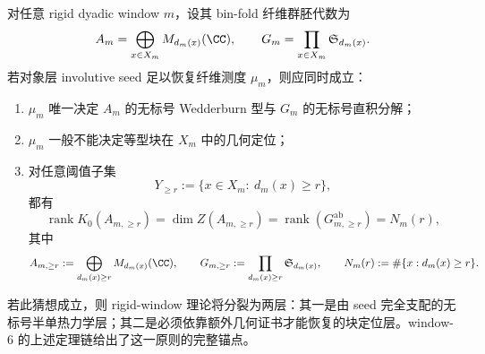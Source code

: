 \begin{conjecture}\label{conj:conclusion-rigid-window-seed-semisimple-type-localization-gap-principle}
对任意 rigid dyadic window \(m\)，设其 bin-fold 纤维群胚代数为
\[
A_m=\bigoplus_{x\in X_m}M_{d_m(x)}(\CC),
\qquad
G_m=\prod_{x\in X_m}\mathfrak S_{d_m(x)}.
\]
若对象层 involutive seed 足以恢复纤维测度 \(\mu_m\)，则应同时成立：
\begin{enumerate}
  \item \(\mu_m\) 唯一决定 \(A_m\) 的无标号 Wedderburn 型与 \(G_m\) 的无标号直积分解；
  \item \(\mu_m\) 一般不能决定等型块在 \(X_m\) 中的几何定位；
  \item 对任意阈值子集
  \[
  Y_{\ge r}:=\{x\in X_m:\ d_m(x)\ge r\},
  \]
  都有
  \[
  \operatorname{rank}K_0(A_{m,\ge r})
  =
  \dim Z(A_{m,\ge r})
  =
  \operatorname{rank}(G_{m,\ge r}^{\mathrm{ab}})
  =
  N_m(r),
  \]
  其中
  \[
  A_{m,\ge r}:=\bigoplus_{d_m(x)\ge r}M_{d_m(x)}(\CC),
  \qquad
  G_{m,\ge r}:=\prod_{d_m(x)\ge r}\mathfrak S_{d_m(x)},
  \qquad
  N_m(r):=\#\{x:d_m(x)\ge r\}.
  \]
\end{enumerate}
若此猜想成立，则 rigid-window 理论将分裂为两层：其一是由 seed 完全支配的无标号半单热力学层；其二是必须依靠额外几何证书才能恢复的块定位层。window-\(6\) 的上述定理链给出了这一原则的完整锚点。
\end{conjecture}
